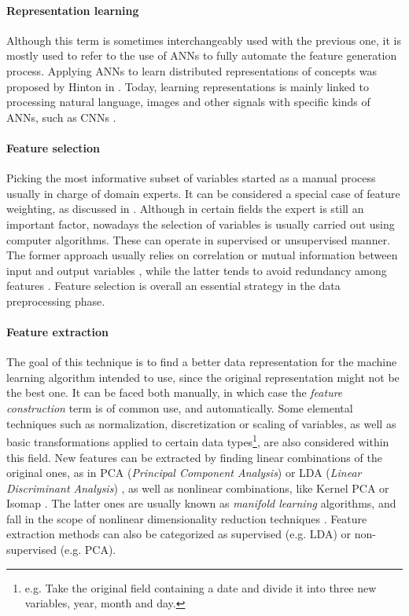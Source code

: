     \paragraph{Representation learning \cite{bengio_representation_2013}}
    Although this term is sometimes interchangeably used with the previous one, it is mostly used to refer to the use of ANNs to fully automate the feature generation process. Applying ANNs to learn distributed representations of concepts was proposed by Hinton in \cite{DistributedRepresentations}. Today, learning representations is mainly linked to processing natural language, images and other signals with specific kinds of ANNs, such as CNNs \cite{CNNs}.
  
    \paragraph{Feature selection \cite{DataPreprocessing}} 
    Picking the most informative subset of variables started as a manual process usually in charge of domain experts. It can be considered a special case of feature weighting, as discussed in \cite{FeatureWeighting}. Although in certain fields the expert is still an important factor, nowadays the selection of variables is usually carried out using computer algorithms. These can operate in supervised or unsupervised manner. The former approach usually relies on correlation or mutual information between input and output variables \cite{CorrelationFS,MutualInformationDS}, while the latter tends to avoid redundancy among features \cite{UnsupervisedFS}. Feature selection is overall an essential strategy in the data preprocessing \cite{PreprocTutorial, DataPreprocessing} phase.
    
    \paragraph{Feature extraction \cite{FeatureExtractionIntro}} 
    The goal of this technique is to find a better data representation for the machine learning algorithm intended to use, since the original representation might not be the best one. It can be faced both manually, in which case the \textit{feature construction} term is of common use, and automatically. Some elemental techniques such as normalization, discretization or scaling of variables, as well as basic transformations applied to certain data types\footnote{e.g. Take the original field containing a date and divide it into three new variables, year, month and day.}, are also considered within this field. New features can be extracted by finding linear combinations of the original ones, as in PCA (\textit{Principal Component Analysis}) \cite{PCA,PCAHotelling} or LDA (\textit{Linear Discriminant Analysis}) \cite{LDA}, as well as nonlinear combinations, like Kernel PCA \cite{KernelPCA}  or Isomap \cite{Isomap}. The latter ones are usually known as \textit{manifold learning} \cite{ManifoldLearning} algorithms, and fall in the scope of nonlinear dimensionality reduction techniques \cite{NonlinearDimRec}. Feature extraction methods can also be categorized as supervised (e.g. LDA) or non-supervised (e.g. PCA).
    
